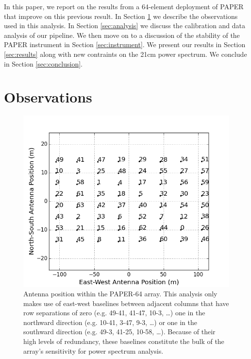 \documentclass[twocolumn,numberedappendix]{emulateapj} \shorttitle{PSA64}
\begin{document}
In this paper, we report on the results from a 64-element deployment of PAPER
that improve on this previous result.  In Section
\ref{sec:observations} we describe the observations used in this analysis. In
Section \ref{sec:analysis} we discuss the calibration and data analysis of our pipeline.
We then move on to a discussion of the stability of the PAPER instrument in
Section \ref{sec:instrument}. We present our results in Section
\ref{sec:results} along with new contraints on the 21cm power spectrum.
We conclude in Section \ref{sec:conclusion}.



\section{Observations}\label{sec:observations}

\begin{figure}[!t]\centering
\includegraphics[width=\columnwidth]{plots/antenna_positions.png}
\caption{
Antenna position within the PAPER-64 array.
This analysis only makes use of
east-west baselines between adjacent columns that have row
separations of zero (e.g. 49-41, 41-47, 10-3, \dots)
one in the northward direction (e.g. 10-41, 3-47, 9-3, \dots) or
one in the southward direction (e.g. 49-3, 41-25, 10-58, \dots).
Because of their high levels of redundancy, 
these baselines constitute the bulk of the array's sensitivity for power
spectrum analysis.}
\label{fig:antenna_positions}
\end{figure}
\end{document}
